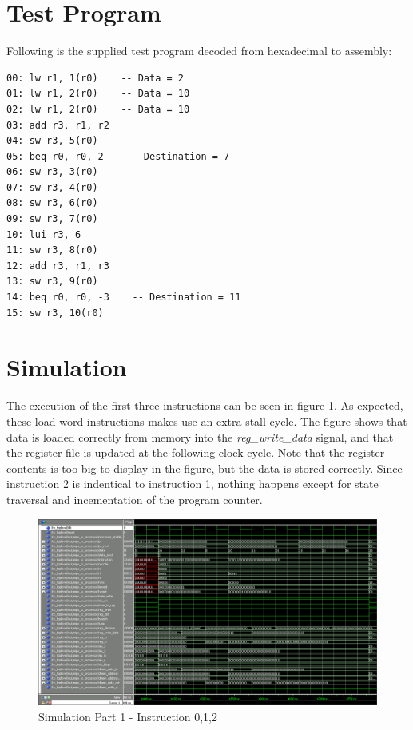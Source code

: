\section{Test Program}

Following is the supplied test program decoded from hexadecimal to assembly:

\begin{verbatim}
00: lw r1, 1(r0)    -- Data = 2
01: lw r1, 2(r0)    -- Data = 10
02: lw r1, 2(r0)    -- Data = 10
03: add r3, r1, r2
04: sw r3, 5(r0)
05: beq r0, r0, 2    -- Destination = 7
06: sw r3, 3(r0)
07: sw r3, 4(r0)
08: sw r3, 6(r0)
09: sw r3, 7(r0)
10: lui r3, 6
11: sw r3, 8(r0)
12: add r3, r1, r3
13: sw r3, 9(r0)
14: beq r0, r0, -3    -- Destination = 11
15: sw r3, 10(r0)
\end{verbatim}

\section{Simulation}

The execution of the first three instructions can be seen in figure \ref{fig:sim1}. As expected, these load word instructions makes use an extra stall cycle. The figure shows that data is loaded correctly from memory into the \emph{reg_write_data} signal, and that the register file is updated at the following clock cycle. Note that the register contents is too big to display in the figure, but the data is stored correctly. Since instruction 2 is indentical to instruction 1, nothing happens except for state traversal and incementation of the program counter.

\begin{figure}[ht]
    \centering
    \includegraphics[scale=0.3]{figures/sim1.png}
    \caption{\label{fig:sim1}Simulation Part 1 - Instruction 0,1,2}
\end{figure}

